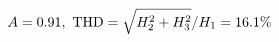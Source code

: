 \documentclass[preview]{standalone}
\begin{document}
\begin{align*}
\special{dvisvgm:raw <g id='unique000'>}A=0.91,\ \text{THD}=\sqrt{H_2^2+H_3^2}/H_1=16.1\%\special{dvisvgm:raw </g>}
\end{align*}
\end{document}
